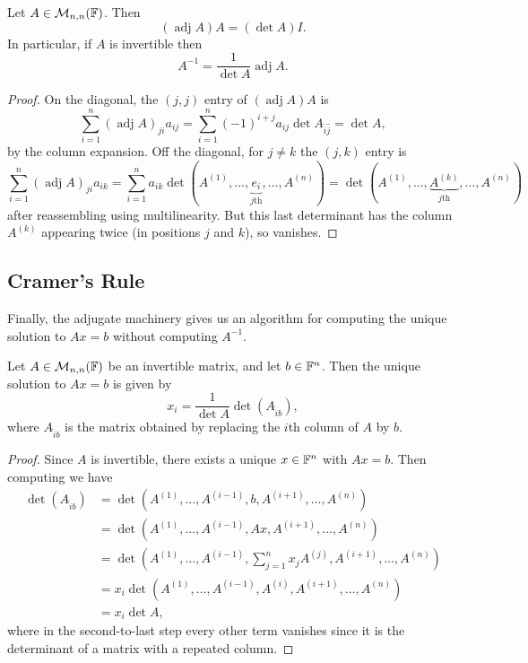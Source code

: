 \documentclass[a4paper]{scrartcl}
\newcommand{\adj}{\operatorname{adj}}
\begin{document}
\begin{theorem}
    Let $A \in \mathcal{M}_{n,n}(\mathbb{F})$. Then
    $$
    (\adj A) A = (\det A) I.
    $$
    In particular, if $A$ is invertible then
    $$
    A^{-1} = \frac{1}{\det A} \adj A.
    $$
\end{theorem}
\begin{proof}
    On the diagonal, the $(j, j)$ entry of $(\adj A)A$ is
    $$
    \sum_{i = 1}^n (\adj A)_{ji} a_{ij} = \sum_{i = 1}^n (-1)^{i + j} a_{ij}\det A_{\widehat{i}\widehat{j}} = \det A,
    $$
    by the column expansion. Off the diagonal, for $j \neq k$ the $(j, k)$ entry is
    $$
    \sum_{i = 1}^n (\adj A)_{ji} a_{ik} = \sum_{i = 1}^n a_{ik} \det (A^{(1)}, \dots, \underbrace{e_i}_{j\text{th}}, \dots, A^{(n)}) = \det(A^{(1)}, \dots, \underbrace{A^{(k)}}_{j\text{th}}, \dots, A^{(n)})
    $$
    after reassembling using multilinearity. But this last determinant has the column $A^{(k)}$ appearing twice (in positions $j$ and $k$), so vanishes.
\end{proof}

\subsection{Cramer's Rule}

Finally, the adjugate machinery gives us an algorithm for computing the unique solution to $Ax = b$ without computing $A^{-1}$.

\begin{proposition}
    Let $A \in \mathcal{M}_{n , n}(\mathbb{F})$ be an invertible matrix, and let $b \in \mathbb{F}^n$. Then the unique solution to $Ax = b$ is given by
    $$
    x_i = \frac{1}{\det A} \det(A_{\widehat{i}b}),
    $$
    where $A_{\widehat{i}b}$ is the matrix obtained by replacing the $i$th column of $A$ by $b$.
\end{proposition}
\begin{proof}
    Since $A$ is invertible, there exists a unique $x \in \mathbb{F}^n$ with $Ax = b$. Then
    computing we have
    \begin{align*}
        \det(A_{\widehat{i}b}) &= \det(A^{(1)}, \dots, A^{(i - 1)}, b, A^{(i + 1)}, \dots, A^{(n)}) \\
        &= \det(A^{(1)}, \dots, A^{(i - 1)}, Ax, A^{(i + 1)}, \dots, A^{(n)}) \\
        &= \det\left(A^{(1)}, \dots, A^{(i - 1)}, \sum_{j = 1}^n x_j A^{(j)}, A^{(i + 1)}, \dots, A^{(n)}\right) \\
        &= x_i \det(A^{(1)}, \dots, A^{(i - 1)}, A^{(i)}, A^{(i + 1)}, \dots, A^{(n)})  \\
        &= x_i \det A,
    \end{align*}
    where in the second-to-last step every other term vanishes since it is the determinant of a matrix with a repeated column.
\end{proof}
\end{document}

